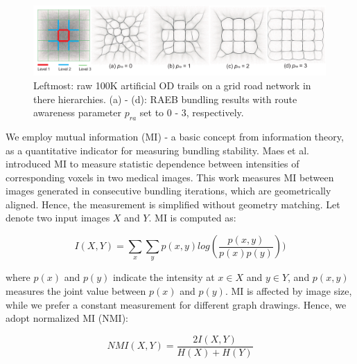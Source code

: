 \begin{figure}[t]
	\centering
	\includegraphics[width=0.995\textwidth]{figure/edgebundling/fig6_grid/route}
	\vspace{-4mm}
	\caption{
		Leftmost: raw 100K artificial OD trails on a grid road network in there hierarchies. 
		(a) - (d): RAEB bundling results with route awareness parameter $p_{ra}$ set to 0 - 3, respectively.
		}
	\label{fig:grid}
	\vspace{-4mm}
\end{figure}

We employ mutual information (MI) - a basic concept from information theory, as a quantitative indicator for measuring bundling stability.
Maes et al.~\cite{maes1997multimodality} introduced MI to measure statistic dependence between intensities of corresponding voxels in two medical images.
This work measures MI between images generated in consecutive bundling iterations, which are geometrically aligned.
Hence, the measurement is simplified without geometry matching. 
Let denote two input images $X$ and $Y$.
MI is computed as:

\vspace{-2mm} 
\begin{equation} \label{eq:mi}
I(X, Y) = \sum_{x}\sum_{y}p(x,y)log(\frac{p(x,y)}{p(x)p(y)}))
\end{equation}

\noindent
where $p(x)$ and $p(y)$ indicate the intensity at $x \in X$ and $y \in Y$, and $p(x, y)$ measures the joint value between $p(x)$ and $p(y)$.
MI is affected by image size, while we prefer a constant measurement for different graph drawings.
Hence, we adopt normalized MI (NMI):

\vspace{-2mm} 
\begin{equation}\label{eq:nmi}
NMI(X, Y) = \frac{2I(X,Y)}{H(X) + H(Y)} 
\end{equation}

